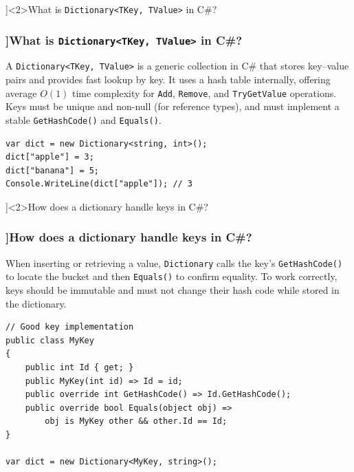 \QuestionSlide[\CategoryBadge[LangColor!20]{C\#}  ]<2>{What is \texttt{Dictionary<TKey, TValue>} in C\#?}
\begin{frame}[fragile]
  \frametitle{\AnswerTitle[\CategoryBadge[LangColor!20]{C\#}  ]{What is \texttt{Dictionary<TKey, TValue>} in C\#?}}

  {\footnotesize %
    A \texttt{Dictionary<TKey, TValue>} is a generic collection in C\# that stores key–value pairs and provides fast lookup by key. It uses a hash table internally, offering average \(O(1)\) time complexity for \texttt{Add}, \texttt{Remove}, and \texttt{TryGetValue} operations. Keys must be unique and non-null (for reference types), and must implement a stable \texttt{GetHashCode()} and \texttt{Equals()}.
  }

  \begin{verbatim}
var dict = new Dictionary<string, int>();
dict["apple"] = 3;
dict["banana"] = 5;
Console.WriteLine(dict["apple"]); // 3
  \end{verbatim}
\end{frame}

\QuestionSlide[\CategoryBadge[CollColor!20]{Collections}]<2>{How does a dictionary handle keys in C\#?}
\begin{frame}[fragile]
  \frametitle{\AnswerTitle[\CategoryBadge[CollColor!20]{Collections}]{How does a dictionary handle keys in C\#?}}

  {\footnotesize
    When inserting or retrieving a value, \texttt{Dictionary} calls the key’s \texttt{GetHashCode()} to locate the bucket and then \texttt{Equals()} to confirm equality. To work correctly, keys should be immutable and must not change their hash code while stored in the dictionary.
  }

  \begin{verbatim}
// Good key implementation
public class MyKey
{
    public int Id { get; }
    public MyKey(int id) => Id = id;
    public override int GetHashCode() => Id.GetHashCode();
    public override bool Equals(object obj) =>
        obj is MyKey other && other.Id == Id;
}

var dict = new Dictionary<MyKey, string>();
  \end{verbatim}
\end{frame}


